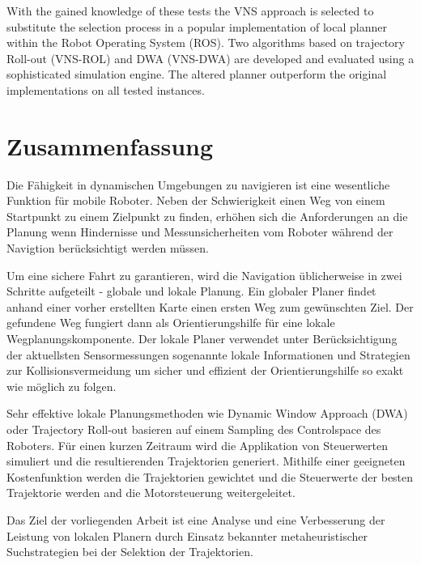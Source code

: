 With the gained knowledge of these tests the VNS approach is selected to substitute the selection process in a popular implementation of local planner within the Robot Operating System (ROS). 
Two algorithms based on trajectory Roll-out (VNS-ROL) and DWA (VNS-DWA) are developed and evaluated using a sophisticated simulation engine. 
The altered planner outperform the original implementations on all tested instances.
\vfill
\newpage

\chapter*{Zusammenfassung}
Die F\"ahigkeit in dynamischen Umgebungen zu navigieren ist eine wesentliche Funktion f\"ur mobile Roboter. Neben der Schwierigkeit einen Weg von einem Startpunkt zu einem Zielpunkt zu finden, erh\"ohen sich die Anforderungen an die Planung wenn Hindernisse und Messunsicherheiten vom Roboter w\"ahrend der Navigtion ber\"ucksichtigt werden m\"ussen. 

Um eine sichere Fahrt zu garantieren, wird die Navigation \"ublicherweise in zwei Schritte aufgeteilt - globale und lokale Planung. 
Ein globaler Planer findet anhand einer vorher erstellten Karte einen ersten Weg zum gew\"unschten Ziel. 
Der gefundene Weg fungiert dann als Orientierungshilfe f\"ur eine lokale Wegplanungskomponente. 
Der lokale Planer verwendet unter Ber\"ucksichtigung der aktuellsten Sensormessungen sogenannte lokale Informationen und Strategien zur Kollisionsvermeidung um sicher und effizient der Orientierungshilfe so exakt wie m\"oglich zu folgen. 

Sehr effektive lokale Planungsmethoden wie Dynamic Window Approach (DWA) oder Trajectory Roll-out basieren auf einem Sampling des Controlspace des Roboters. 
F\"ur einen kurzen Zeitraum wird die Applikation von Steuerwerten simuliert und die resultierenden Trajektorien generiert.  
Mithilfe einer geeigneten Kostenfunktion werden die Trajektorien gewichtet und die Steuerwerte der besten Trajektorie werden and die Motorsteuerung weitergeleitet.

Das Ziel der vorliegenden Arbeit ist eine Analyse und eine Verbesserung der Leistung von lokalen Planern durch Einsatz bekannter metaheuristischer Suchstrategien bei der Selektion der Trajektorien.

